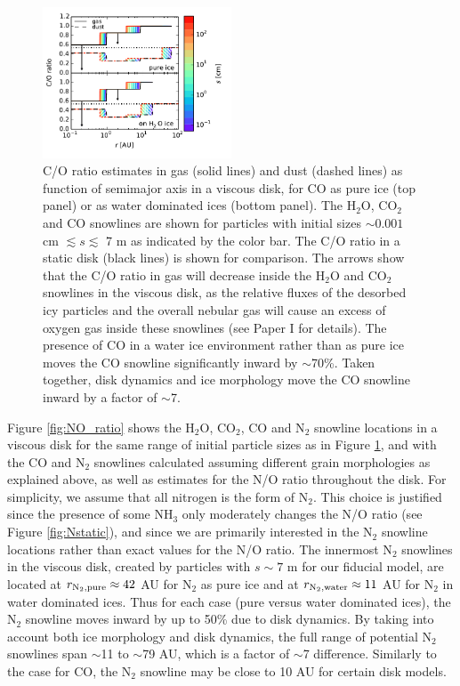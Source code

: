 \documentclass[apj]{emulateapj}
\begin{document}
\begin{figure}[h!]
\centering
\includegraphics[width=0.5\textwidth]{C_O_water_ice.pdf}
\caption{C/O ratio estimates in gas (solid lines) and dust (dashed lines) as function of semimajor axis in a viscous disk, for CO as pure ice (top panel) or as water dominated ices (bottom panel). The H$_2$O, CO$_2$ and CO snowlines are shown for particles with initial sizes $\sim0.001$ cm $\lesssim s \lesssim$ 7 m as indicated by the color bar. The C/O ratio in a static disk (black lines) is shown for comparison. The arrows show that the C/O ratio in gas will decrease inside the H$_2$O and CO$_2$
snowlines in the viscous disk, as the relative fluxes of the desorbed icy
particles and the overall nebular gas will cause an excess of oxygen gas inside these snowlines (see Paper I for details). The presence of CO in a water ice environment rather than as pure ice moves the CO snowline significantly inward by $\sim$70\%. Taken together, disk dynamics and ice morphology move the CO snowline inward by a factor of $\sim$7.} 
\label{fig:CO_ratio}
\end{figure}


Figure \ref{fig:NO_ratio} shows the H$_2$O, CO$_2$, CO and N$_2$ snowline locations in a viscous disk for the same range of initial particle sizes as in Figure \ref{fig:CO_ratio}, and with the CO and N$_2$ snowlines calculated assuming different grain morphologies as explained above, as well as estimates for the N/O ratio throughout the disk. For simplicity, we assume that all nitrogen is the form of N$_2$. This choice is justified since the presence of some NH$_3$ only moderately changes the N/O ratio (see Figure \ref{fig:Nstatic}), and since we are primarily interested in the N$_2$ snowline locations rather than exact values for the N/O ratio. The innermost N$_2$ snowlines in the viscous disk, created by particles with $s \sim 7$ m for our fiducial model, are located at $r_{\rm N_2, pure} \approx 42$ AU for N$_2$ as pure ice and at $r_{\rm N_2, water} \approx 11$ AU for N$_2$ in water dominated ices. Thus for each case (pure versus water dominated ices), the N$_2$ snowline moves inward by up to 50\% due to disk dynamics. By taking into account both ice morphology and disk dynamics, the full range of potential N$_2$ snowlines span $\sim$11 to $\sim$79 AU, which is a factor of $\sim$7 difference. Similarly to the case for CO, the N$_2$ snowline may be close to 10 AU for certain disk models. 
\end{document}
